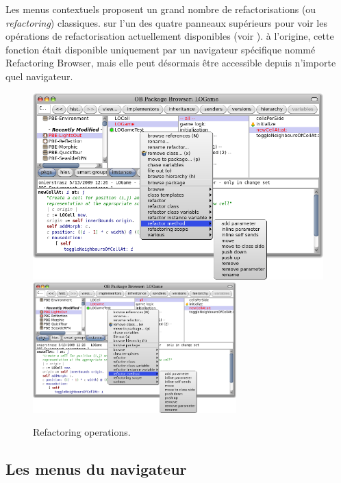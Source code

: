 \documentclass[a4paper,10pt,twoside]{book}
\begin{document}
Les menus contextuels proposent un grand nombre de refactorisations (ou
\emph{refactoring}) classiques. \Actclickz sur l'un des quatre panneaux
supérieurs pour voir les opérations de refactorisation actuellement
disponibles (voir ).
à l'origine, cette fonction était disponible uniquement
par un navigateur spécifique nommé Refactoring Browser, mais
elle peut désormais être accessible depuis n'importe quel
navigateur. %

\begin{figure}[btp]
	\begin{center}
	\ifluluelse
		{\includegraphics[width=\textwidth]{refactoring}}
		{\includegraphics[width=0.7\textwidth]{refactoring}}
	\end{center}
	\caption{Refactoring operations.}
\end{figure} %
\subsection{Les menus du navigateur}
\end{document}

